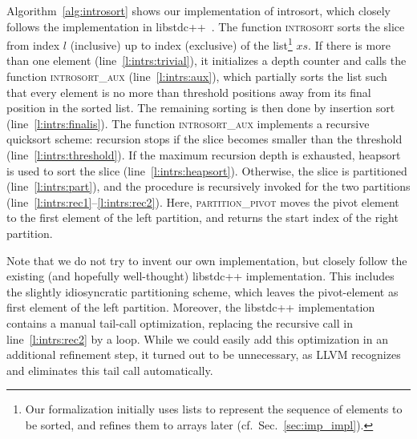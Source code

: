 \documentclass[runningheads]{llncs}
\begin{document}
  Algorithm~\ref{alg:introsort} shows our implementation of introsort, which closely follows the implementation in libstdc++~\cite{libstdc++}.
  The function \textsc{introsort} sorts the slice from index \is$l$ (inclusive) up to index  (exclusive) of the list\footnote{%
    Our formalization initially uses lists to represent the sequence of elements to be sorted, and refines them to arrays later (cf.\ Sec.\ \ref{sec:imp_impl}).
  } $xs$.
  If there is more than one element (line~\ref{l:intrs:trivial}), it initializes a depth
  counter and calls the function \textsc{introsort\_aux} (line~\ref{l:intrs:aux}), which partially sorts the list such that every element is no more than
  threshold positions away from its final position in the sorted list. The remaining sorting is then done by insertion sort (line~\ref{l:intrs:finalis}).
  The function \textsc{introsort\_aux} implements a recursive quicksort scheme: recursion stops if the slice becomes smaller than the threshold (line~\ref{l:intrs:threshold}).
  If the maximum recursion depth is exhausted, heapsort is used to sort the slice (line~\ref{l:intrs:heapsort}).
  Otherwise, the slice is partitioned (line~\ref{l:intrs:part}), and the procedure is
  recursively invoked for the two partitions (line~\ref{l:intrs:rec1}--\ref{l:intrs:rec2}).
  Here, \textsc{partition\_pivot} moves the pivot element to the first element of the left partition, and returns the start index of the right partition.

  Note that we do not try to invent our own implementation, but closely follow the existing (and hopefully well-thought) libstdc++ implementation.
  This includes the slightly idiosyncratic partitioning scheme, which leaves the pivot-element as first element of the left partition.
  Moreover, the libstdc++ implementation contains a manual tail-call optimization, replacing the recursive call in line~\ref{l:intrs:rec2} by a loop.
  While we could easily add this optimization in an additional refinement step, it turned out to be unnecessary, as LLVM recognizes and
  eliminates this tail call automatically.
\end{document}
